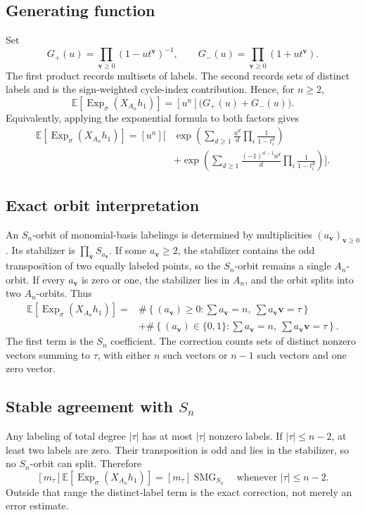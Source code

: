 \documentclass[10pt]{article}
\newcommand{\ExpS}{\operatorname{Exp}_{\sigma}}
\newcommand{\SMG}{\operatorname{SMG}}
\newcommand{\smg}[1]{\mathbb E\!\left[\ExpS\!\left(X_{#1}h_1\right)\right]}
\begin{document}
\subsection{Generating function}
Set
\[
 G_+(u)=\prod_{\mathbf v\ge0}(1-ut^{\mathbf v})^{-1},\qquad
 G_-(u)=\prod_{\mathbf v\ge0}(1+ut^{\mathbf v}).
\]
The first product records multisets of labels.  The second records sets of
distinct labels and is the sign-weighted cycle-index contribution.  Hence, for
$n\ge2$,
\[
 \boxed{\smg{A_n}=[u^n]\bigl(G_+(u)+G_-(u)\bigr).}
\]
Equivalently, applying the exponential formula to both factors gives
\begin{align*}
\smg{A_n}=[u^n]\Bigg[&\exp\left(\sum_{d\ge1}\frac{u^d}{d}
 \prod_i\frac1{1-t_i^d}\right)\\
&+\exp\left(\sum_{d\ge1}\frac{(-1)^{d-1}u^d}{d}
 \prod_i\frac1{1-t_i^d}\right)\Bigg].
\end{align*}

\subsection{Exact orbit interpretation}
An $S_n$-orbit of monomial-basis labelings is determined by multiplicities
$(a_{\mathbf v})_{\mathbf v\ge0}$.  Its stabilizer is
$\prod_{\mathbf v}S_{a_{\mathbf v}}$.  If some $a_{\mathbf v}\ge2$, the
stabilizer contains the odd transposition of two equally labeled points, so the
$S_n$-orbit remains a single $A_n$-orbit.  If every $a_{\mathbf v}$ is zero or
one, the stabilizer lies in $A_n$, and the orbit splits into two $A_n$-orbits.
Thus
\begin{align*}
[m_\tau]\smg{A_n}
={}&\#\left\{(a_{\mathbf v})\ge0:\sum a_{\mathbf v}=n,\ 
 \sum a_{\mathbf v}\mathbf v=\tau\right\}\\
&+\#\left\{(a_{\mathbf v})\in\{0,1\}:\sum a_{\mathbf v}=n,\ 
 \sum a_{\mathbf v}\mathbf v=\tau\right\}.
\end{align*}
The first term is the $S_n$ coefficient.  The correction counts sets of
distinct nonzero vectors summing to $\tau$, with either $n$ such vectors or
$n-1$ such vectors and one zero vector.

\subsection{Stable agreement with \texorpdfstring{$S_n$}{S-n}}
Any labeling of total degree $|\tau|$ has at most $|\tau|$ nonzero labels.  If
$|\tau|\le n-2$, at least two labels are zero.  Their transposition is odd and
lies in the stabilizer, so no $S_n$-orbit can split.  Therefore
\[
 \boxed{[m_\tau]\smg{A_n}=[m_\tau]\SMG_{S_n}
 \quad\text{whenever }|\tau|\le n-2.}
\]
Outside that range the distinct-label term is the exact correction, not merely
an error estimate.
\end{document}
